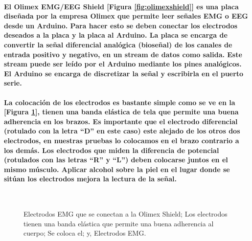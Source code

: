 \documentclass{article}
\begin{document}
\paragraph{
El Olimex EMG/EEG Shield [Figura \ref{fig:olimexshield}] es una placa diseñada por la empresa Olimex que permite leer señales EMG o EEG desde un Arduino. Para hacer esto se deben conectar los electrodos deseados a la placa y la placa al Arduino. La placa se encarga de convertir la señal diferencial analógica (bioseñal) de los canales de entrada positivo y negativo, en un stream de datos como salida. Este stream puede ser leído por el Arduino mediante los pines analógicos. El Arduino se encarga de discretizar la señal y escribirla en el puerto serie.
}

\paragraph{
La colocación de los electrodos es bastante simple como se ve en la [Figura \ref{fig:colocacion-de-electrodos}], tienen una banda elástica de tela que permite una buena adherencia en los brazos. Es importante que el electrodo diferencial (rotulado con la letra ``D'' en este caso) este alejado de los otros dos electrodos, en nuestras pruebas lo colocamos en el brazo contrario a los demás. Los electrodos que miden la diferencia de potencial (rotulados con las letras ``R'' y ``L'') deben colocarse juntos en el mismo músculo. Aplicar alcohol sobre la piel en el lugar donde se sitúan los electrodos mejora la lectura de la señal.
}

\begin{figure}[ht]%
\centering
{}%
\hspace{8pt}%
 \\
%
\hspace{8pt}%
%
\caption[]{
 Electrodos EMG que se conectan a la Olimex Shield;
 Los electrodos tienen una banda elástica que permite una buena adherencia al cuerpo;
 Se coloca el; y,
 Electrodos EMG.}%
\label{fig:colocacion-de-electrodos}%
\end{figure}
\end{document}
